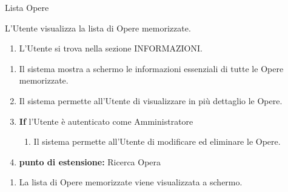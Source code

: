 {\ucTable	%
	{	%
		Lista Opere
		
	}{	%
		
	}{	%
		L'Utente visualizza la lista di Opere memorizzate.
		
	}{	%
		\attori
		
	}{	%
		\begin{enumerate}
			\item L'Utente si trova nella sezione INFORMAZIONI.
		\end{enumerate}
		
	}{	%
		\begin{enumerate}
			\item Il sistema mostra a schermo le informazioni essenziali di tutte le Opere memorizzate.
            \item Il sistema permette all'Utente di visualizzare in più dettaglio le Opere.
            \item \textbf{If} l'Utente è autenticato come Amministratore
            \begin{enumerate}
                \item Il sistema permette all'Utente di modificare ed eliminare le Opere.
            \end{enumerate}
            \item[] \textbf{punto di estensione:} Ricerca Opera
		\end{enumerate}
		
	}{	%
		\begin{enumerate}
			\item La lista di Opere memorizzate viene visualizzata a schermo.
		\end{enumerate}
		
	}{	%
} }


